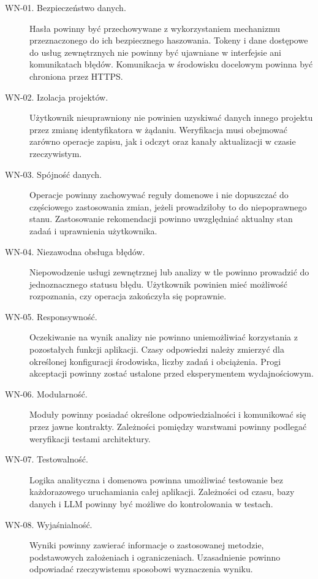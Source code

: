 \begin{description}
    \item[WN-01. Bezpieczeństwo danych.]
    Hasła powinny być przechowywane z wykorzystaniem mechanizmu przeznaczonego do ich bezpiecznego haszowania. Tokeny i dane dostępowe do usług zewnętrznych nie powinny być ujawniane w interfejsie ani komunikatach błędów. Komunikacja w środowisku docelowym powinna być chroniona przez HTTPS.

    \item[WN-02. Izolacja projektów.]
    Użytkownik nieuprawniony nie powinien uzyskiwać danych innego projektu przez zmianę identyfikatora w żądaniu. Weryfikacja musi obejmować zarówno operacje zapisu, jak i odczyt oraz kanały aktualizacji w czasie rzeczywistym.

    \item[WN-03. Spójność danych.]
    Operacje powinny zachowywać reguły domenowe i nie dopuszczać do częściowego zastosowania zmian, jeżeli prowadziłoby to do niepoprawnego stanu. Zastosowanie rekomendacji powinno uwzględniać aktualny stan zadań i uprawnienia użytkownika.

    \item[WN-04. Niezawodna obsługa błędów.]
    Niepowodzenie usługi zewnętrznej lub analizy w tle powinno prowadzić do jednoznacznego statusu błędu. Użytkownik powinien mieć możliwość rozpoznania, czy operacja zakończyła się poprawnie.

    \item[WN-05. Responsywność.]
    Oczekiwanie na wynik analizy nie powinno uniemożliwiać korzystania z pozostałych funkcji aplikacji. Czasy odpowiedzi należy zmierzyć dla określonej konfiguracji środowiska, liczby zadań i obciążenia. Progi akceptacji powinny zostać ustalone przed eksperymentem wydajnościowym.

    \item[WN-06. Modularność.]
    Moduły powinny posiadać określone odpowiedzialności i komunikować się przez jawne kontrakty. Zależności pomiędzy warstwami powinny podlegać weryfikacji testami architektury.

    \item[WN-07. Testowalność.]
    Logika analityczna i domenowa powinna umożliwiać testowanie bez każdorazowego uruchamiania całej aplikacji. Zależności od czasu, bazy danych i LLM powinny być możliwe do kontrolowania w testach.

    \item[WN-08. Wyjaśnialność.]
    Wyniki powinny zawierać informacje o zastosowanej metodzie, podstawowych założeniach i ograniczeniach. Uzasadnienie powinno odpowiadać rzeczywistemu sposobowi wyznaczenia wyniku.


\end{description}
